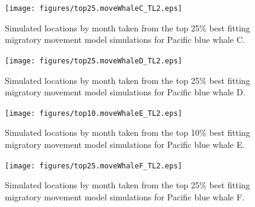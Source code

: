 \documentclass[a4paper,10pt]{article}
\begin{document}
\begin{landscape}
    \begin{figure}[!htbp]
    \centering
      \texttt{[image: figures/top25.moveWhaleC\_TL2.eps]}
      \caption{Simulated locations by month taken from the top 25\% best fitting migratory movement model simulations for Pacific blue whale C.}
      \label{figwhaleC}
  \end{figure}
\end{landscape}

\begin{landscape}
    \begin{figure}[!htbp]
    \centering
      \texttt{[image: figures/top25.moveWhaleD\_TL2.eps]}
      \caption{Simulated locations by month taken from the top 25\% best fitting migratory movement model simulations for Pacific blue whale D.}
      \label{figwhaleD}
  \end{figure}
\end{landscape}

\begin{landscape}
    \begin{figure}[!htbp]
    \centering
      \texttt{[image: figures/top10.moveWhaleE\_TL2.eps]}
      \caption{Simulated locations by month taken from the top 10\% best fitting migratory movement model simulations for Pacific blue whale E.}
      \label{figwhaleE}
  \end{figure}
\end{landscape}

\begin{landscape}
    \begin{figure}[!htbp]
    \centering
      \texttt{[image: figures/top25.moveWhaleF\_TL2.eps]}
      \caption{Simulated locations by month taken from the top 25\% best fitting migratory movement model simulations for Pacific blue whale F.}
      \label{figwhaleF}
  \end{figure}
\end{landscape}

 
\newpage


\end{document}

